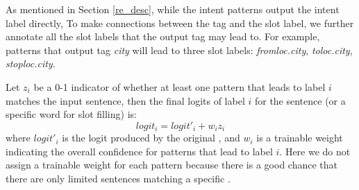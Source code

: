 As mentioned in Section \ref{re_desc}, while the intent \RE patterns output the intent label directly,  To make connections between the \RE tag and the slot label, we further annotate all the slot labels that the output tag may lead to. For example, patterns that output tag \emph{city} will lead to three slot labels: \emph{fromloc.city}, \emph{toloc.city}, \emph{stoploc.city}.

Let $z_i$ be a 0-1 indicator of whether at least one \RE pattern that leads to label $i$ matches the input sentence, then the final logits of label $i$ for the sentence (or a specific word for slot filling) is: 
\begin{equation}
logit_i = logit'_i + w_i z_i
\end{equation}
where $logit'_i$ is the logit produced by the original \NN, and $w_i$ is a trainable weight indicating the overall confidence for patterns that lead to label $i$.
Here we do not assign a trainable weight for each pattern because there is a good chance that there are only limited sentences matching a specific \RE. 


